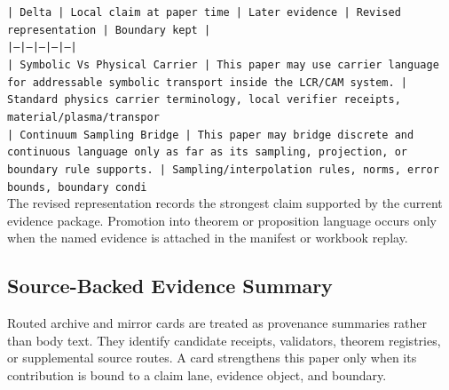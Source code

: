 \documentclass[11pt]{article}
\begin{document}
\noindent\texttt{| Delta | Local claim at paper time | Later evidence | Revised representation | Boundary kept |}\\
\noindent\texttt{|---|---|---|---|---|}\\
\noindent\texttt{| Symbolic Vs Physical Carrier | This paper may use carrier language for addressable symbolic transport inside the LCR/CAM system. | Standard physics carrier terminology, local verifier receipts, material/plasma/transpor}\\
\noindent\texttt{| Continuum Sampling Bridge | This paper may bridge discrete and continuous language only as far as its sampling, projection, or boundary rule supports. | Sampling/interpolation rules, norms, error bounds, boundary condi}\\

The revised representation records the strongest claim supported by the current evidence package. Promotion into theorem or proposition language occurs only when the named evidence is attached in the manifest or workbook replay.

\subsection*{Source-Backed Evidence Summary}

Routed archive and mirror cards are treated as provenance summaries rather than
body text. They identify candidate receipts, validators, theorem registries, or
supplemental source routes. A card strengthens this paper only when its
contribution is bound to a claim lane, evidence object, and boundary.
\end{document}
